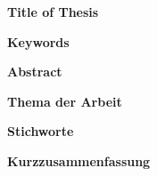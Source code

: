 %
%
\newpage
\thispagestyle{plain}
\clearpage
\hfuzz=12pt       %

\textbf{\IthesisAuthor}

\vspace{0.3cm}
\textbf{Title of Thesis}

\IthesisTitleEN

\vspace{0.3cm}
\textbf{Keywords}

\begin{minipage}{\textwidth}
\IkeyWordsEN
\end{minipage}

\vspace{0.3cm}
\textbf{Abstract}

\begin{minipage}{\textwidth}
\IabstractEN
\end{minipage}

\vspace{1.0cm}

\textbf{\IthesisAuthor}

\vspace{0.3cm}
\textbf{Thema der Arbeit}

\IthesisTitle

\vspace{0.3cm}
\textbf{Stichworte}

\IkeyWordsDE

\vspace{0.3cm}
\textbf{Kurzzusammenfassung}

\IabstractDE
